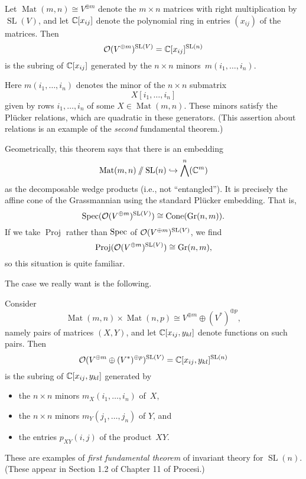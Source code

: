 \documentclass[11pt]{amsart}
\DeclareMathOperator{\SL}{SL}
\DeclareMathOperator{\Mat}{Mat}
\DeclareMathOperator{\Proj}{Proj}
\begin{document}
\begin{thm}
Let $\Mat(m,n) \cong V^{\oplus m}$ denote the $m \times n$ matrices with right multiplication by $\SL(V)$, and let $\mathbb C[x_{ij}]$ denote
the polynomial ring in entries $(x_{ij})$ of the matrices.
Then
\[
\cO(V^{\oplus m})^{\SL(V)} = \CC[x_{ij}]^{\SL(n)}
\]
is the subring of $\mathbb C[x_{ij}]$ generated by the $n \times n$ minors~$m(i_1,\ldots, i_n)$.
\end{thm}

Here $m(i_1,\ldots, i_n)$ denotes the minor of the $n \times n$ submatrix 
\[
X[i_1,\ldots,i_n]
\]
given by rows $i_1,\ldots,i_n$ of some $X \in \Mat(m,n)$.
These minors satisfy the Pl\"ucker relations, which are quadratic in these generators.
(This assertion about relations is an example of the {\em second} fundamental theorem.)

Geometrically, this theorem says that there is an embedding
\[
\Mat(m,n)\sslash \SL(n) \hookrightarrow \bigwedge^n(\CC^m)
\]
as the decomposable wedge products (i.e., not ``entangled'').
It is precisely the affine cone of the Grassmannian using the standard Pl\"ucker embedding.
That is,
\[
\Spec(\cO(V^{\oplus m})^{\SL(V)}) \cong {\rm Cone}(\Gr(n,m)).
\]
If we take $\Proj$ rather than $\operatorname{Spec}$ of $\cO(V^{\oplus m})^{\SL(V)}$, 
we find
\[
\Proj(\cO(V^{\oplus m})^{\SL(V)}) \cong \Gr(n,m),
\]
so this situation is quite familiar.

The case we really want is the following.

\begin{thm}[FFT for $\SL(n)$]
\label{FFT}
Consider 
\[
\Mat(m,n) \times \Mat(n,p)\cong V^{\oplus m} \oplus (V^*)^{\oplus p},
\]
namely pairs of matrices $(X,Y)$, and let $\mathbb C[x_{ij}, y_{kl}]$ denote functions on such pairs.
Then
\[
\cO(V^{\oplus m} \oplus (V^*)^{\oplus p})^{\SL(V)} = \CC[x_{ij}, y_{kl}]^{\SL(n)}
\]
is the subring of $\mathbb C[x_{ij}, y_{kl}]$ generated by 
\begin{itemize}
\item the $n \times n$ minors $m_X(i_1,\ldots, i_n)$ of~$X$,
\item the $n \times n$ minors $m_Y(j_1,\ldots, j_n)$ of $Y$, and
\item the entries $p_{XY}(i,j)$ of the product~$XY$.
\end{itemize}
\end{thm}

These are examples of {\em first fundamental theorem} of invariant theory for $\SL(n)$.
(These appear in Section 1.2 of Chapter 11 of Procesi.)
\end{document}
